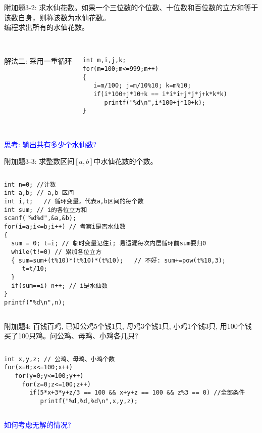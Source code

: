 \begin{frame}[fragile]
附加题3-2: 求水仙花数。如果一个三位数的个位数、十位数和百位数的立方和等于该数自身，则称该数为水仙花数。 \\
编程求出所有的水仙花数。\\
~\\ 
\pause
\begin{columns}
解法二: 采用一重循环
\begin{lstlisting}
int m,i,j,k; 
for(m=100;m<=999;m++)
{
   i=m/100; j=m/10%10; k=m%10;  
   if(i*100+j*10+k == i*i*i+j*j*j+k*k*k)  
      printf("%d\n",i*100+j*10+k);
}
\end{lstlisting}
\end{columns}
~\\
\textcolor{blue}{思考: 输出共有多少个水仙数?}
\end{frame}

\begin{frame}[fragile]
附加题3-3: 求整数区间$[a,b]$中水仙花数的个数。
\pause
\vspace{-0.2cm}
\begin{columns}
\begin{lstlisting}
int n=0; //计数 
int a,b; // a,b 区间
int i,t;   // 循环变量，代表a,b区间的每个数
int sum; // i的各位立方和 
scanf("%d%d",&a,&b);
for(i=a;i<=b;i++) // 考察i是否水仙数
{  
  sum = 0; t=i; // 临时变量记住i; 易遗漏每次内层循环前sum要归0
  while(t!=0) // 累加各位立方 
  { sum=sum+(t%10)*(t%10)*(t%10);   // 不好: sum+=pow(t%10,3);
     t=t/10; 
  }
  if(sum==i) n++; // i是水仙数 
}
printf("%d\n",n);
\end{lstlisting}
\end{columns}
\end{frame}

\begin{frame}[fragile]
附加题4: 百钱百鸡, 已知公鸡5个钱1只, 母鸡3个钱1只, 小鸡1个钱3只, 用100个钱买了100只鸡。问公鸡、母鸡、小鸡各几只? 
\vspace{0.5cm}
\pause
\begin{columns}
\begin{lstlisting}
int x,y,z; // 公鸡、母鸡、小鸡个数
for(x=0;x<=100;x++) 
   for(y=0;y<=100;y++) 
     for(z=0;z<=100;z++) 
       if(5*x+3*y+z/3 == 100 && x+y+z == 100 && z%3 == 0) //全部条件 
          printf("%d,%d,%d\n",x,y,z);
\end{lstlisting}
\end{columns}
\vspace{0.5cm}
\textcolor{blue}{如何考虑无解的情况?}
\end{frame}

